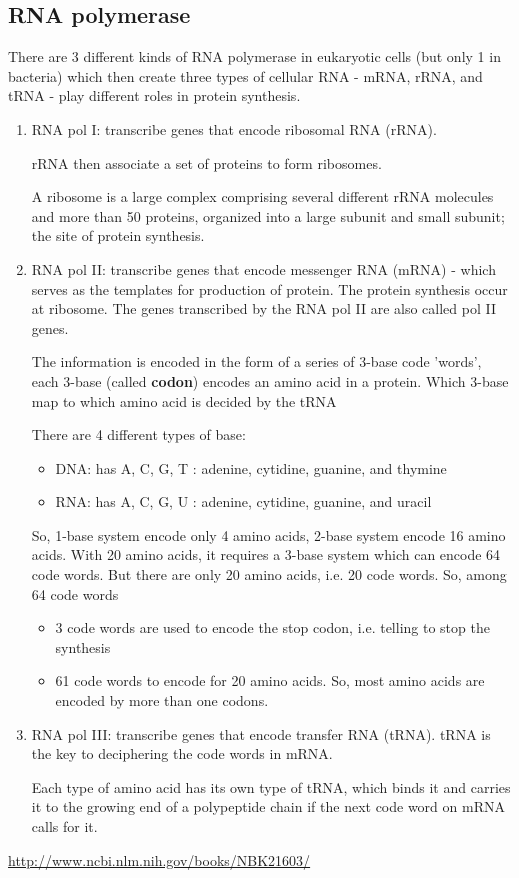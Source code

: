 \subsection{RNA polymerase}
\label{sec:RNA-polymerase}

There are 3 different kinds of RNA polymerase in eukaryotic cells (but only 1
in bacteria) which then create three types of cellular RNA - mRNA, rRNA, and
tRNA - play different roles in protein synthesis.

\begin{enumerate}
  \item RNA pol I: transcribe genes that encode ribosomal RNA (rRNA).
  
  rRNA then associate a set of proteins to form ribosomes.
  
  A ribosome is a large complex comprising several different rRNA molecules and
  more than 50 proteins, organized into a large subunit and small subunit; the
  site of protein synthesis.
  
  
  \item RNA pol II: transcribe genes that encode messenger RNA (mRNA) - which
  serves as the templates for production of protein. The protein synthesis occur
  at ribosome. The genes transcribed by the RNA pol II are also called pol II
  genes.
  
  The information is encoded in the form of a series of 3-base code 'words',
  each 3-base (called {\bf codon}) encodes an amino acid in a protein. Which
  3-base map to which amino acid is decided by the tRNA
  
  There are 4 different types of base: 
  \begin{itemize}
    \item DNA: has A, C, G, T : adenine, cytidine, guanine, and thymine
    \item RNA: has A, C, G, U : adenine, cytidine, guanine, and uracil
  \end{itemize}
  So, 1-base system encode only 4 amino acids, 2-base system encode 16 amino
  acids. With 20 amino acids, it requires a 3-base system which can encode 64
  code words. But there are only 20 amino acids, i.e. 20 code words. So, among
  64 code words
  \begin{itemize}
    \item 3 code words are used to encode the stop codon, i.e. telling to stop
    the synthesis
    
    \item 61 code words to encode for 20 amino acids. So, most amino acids are
    encoded by more than one codons.
  \end{itemize}
  
  \item RNA pol III: transcribe genes that encode transfer RNA (tRNA).
  tRNA is the key to deciphering the code words in mRNA.
  
  Each type of amino acid has its own type of tRNA, which binds it and carries
  it to the growing end of a polypeptide chain if the next code word on mRNA
  calls for it.
  
\end{enumerate}
\url{http://www.ncbi.nlm.nih.gov/books/NBK21603/}

